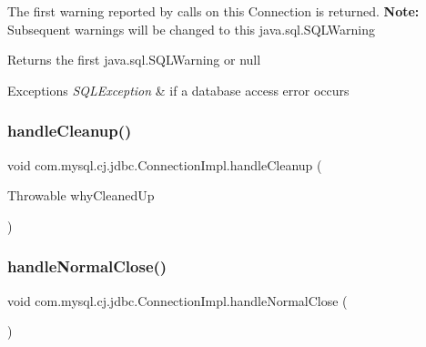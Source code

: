 The first warning reported by calls on this Connection is returned. {\bfseries Note\+:} Subsequent warnings will be changed to this java.\+sql.\+S\+Q\+L\+Warning

\begin{DoxyReturn}{Returns}
the first java.\+sql.\+S\+Q\+L\+Warning or null 
\end{DoxyReturn}

\begin{DoxyExceptions}{Exceptions}
{\em S\+Q\+L\+Exception} & if a database access error occurs \\
\hline
\end{DoxyExceptions}
\mbox{\label{classcom_1_1mysql_1_1cj_1_1jdbc_1_1_connection_impl_abbc1c0bed65af017e91a8e40db123895}} 
\subsubsection{\texorpdfstring{handle\+Cleanup()}{handleCleanup()}}
{\footnotesize\ttfamily void com.\+mysql.\+cj.\+jdbc.\+Connection\+Impl.\+handle\+Cleanup (\begin{DoxyParamCaption}\item[{Throwable}]{why\+Cleaned\+Up }\end{DoxyParamCaption})}

\mbox{\label{classcom_1_1mysql_1_1cj_1_1jdbc_1_1_connection_impl_a0850afe4f4548d6690c2e9fdf1cd6e9c}} 
\subsubsection{\texorpdfstring{handle\+Normal\+Close()}{handleNormalClose()}}
{\footnotesize\ttfamily void com.\+mysql.\+cj.\+jdbc.\+Connection\+Impl.\+handle\+Normal\+Close (\begin{DoxyParamCaption}{ }\end{DoxyParamCaption})}

